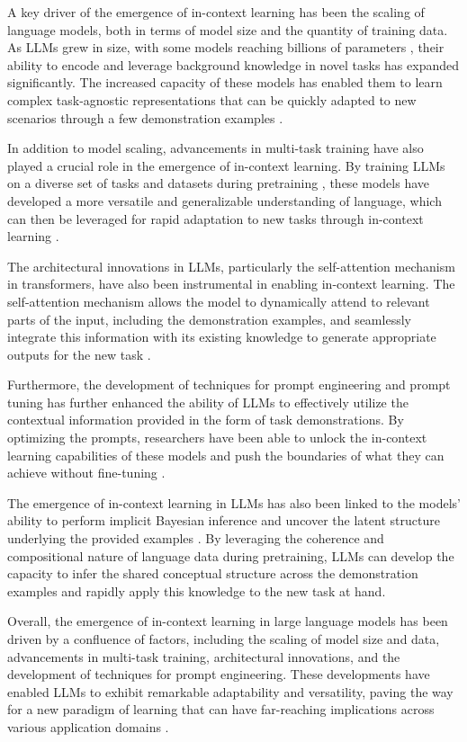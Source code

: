 \documentclass[11pt]{article}
\begin{document}
A key driver of the emergence of in-context learning has been the scaling of language models, both in terms of model size and the quantity of training data. As LLMs grew in size, with some models reaching billions of parameters \cite{ref18}, their ability to encode and leverage background knowledge in novel tasks has expanded significantly. The increased capacity of these models has enabled them to learn complex task-agnostic representations that can be quickly adapted to new scenarios through a few demonstration examples \cite{ref19}.

In addition to model scaling, advancements in multi-task training have also played a crucial role in the emergence of in-context learning. By training LLMs on a diverse set of tasks and datasets during pretraining \cite{ref20}, these models have developed a more versatile and generalizable understanding of language, which can then be leveraged for rapid adaptation to new tasks through in-context learning \cite{ref21}.

The architectural innovations in LLMs, particularly the self-attention mechanism in transformers, have also been instrumental in enabling in-context learning. The self-attention mechanism allows the model to dynamically attend to relevant parts of the input, including the demonstration examples, and seamlessly integrate this information with its existing knowledge to generate appropriate outputs for the new task \cite{ref13}.

Furthermore, the development of techniques for prompt engineering and prompt tuning \cite{ref3} has further enhanced the ability of LLMs to effectively utilize the contextual information provided in the form of task demonstrations. By optimizing the prompts, researchers have been able to unlock the in-context learning capabilities of these models and push the boundaries of what they can achieve without fine-tuning \cite{ref22}.

The emergence of in-context learning in LLMs has also been linked to the models' ability to perform implicit Bayesian inference and uncover the latent structure underlying the provided examples \cite{ref23}. By leveraging the coherence and compositional nature of language data during pretraining, LLMs can develop the capacity to infer the shared conceptual structure across the demonstration examples and rapidly apply this knowledge to the new task at hand.

Overall, the emergence of in-context learning in large language models has been driven by a confluence of factors, including the scaling of model size and data, advancements in multi-task training, architectural innovations, and the development of techniques for prompt engineering. These developments have enabled LLMs to exhibit remarkable adaptability and versatility, paving the way for a new paradigm of learning that can have far-reaching implications across various application domains \cite{ref24}.
\end{document}
